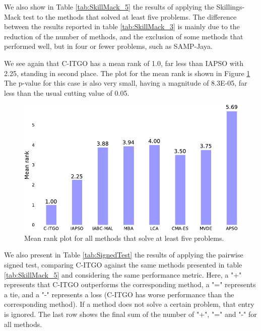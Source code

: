 We also show in Table \ref{tab:SkillMack_5} the results of applying the Skillings-Mack test to the methods that solved at least five problems. The difference between the results reported in table \ref{tab:SkillMack_3} is mainly due to the reduction of the number of methods, and the exclusion of some methods that performed well, but in four or fewer problems, such as SAMP-Jaya.



We see again that C-ITGO has a mean rank of 1.0, far less than IAPSO with 2.25, standing in second place. The plot for the mean rank is shown in Figure \ref{fig:SkillMack_5} The p-value for this case is also very small, having a magnitude of 8.3E-05, far less than the usual cutting value of 0.05.


\begin{figure}[h]
    \begin{center}
    \includegraphics[scale=0.6]{Imgs/SkillMack_5-crop.pdf}
    \end{center}
    \captionsetup{justification=centering}
    \vspace*{-4mm}
    \caption{Mean rank plot for all methods that solve at least five problems.}\label{fig:SkillMack_5}
\end{figure}


We also present in Table \ref{tab:SignedTest} the results of applying the pairwise signed test, comparing C-ITGO against the same methods presented in table \ref{tab:SkillMack_5} and considering the same performance metric. Here, a "+" represents that C-ITGO outperforms the corresponding method, a "=" represents a tie, and a "-" represents a loss (C-ITGO has worse performance than the corresponding method). If a method does not solve a certain problem, that entry is ignored. The last row shows the final sum of the number of "+", "=" and "-" for all methods.

